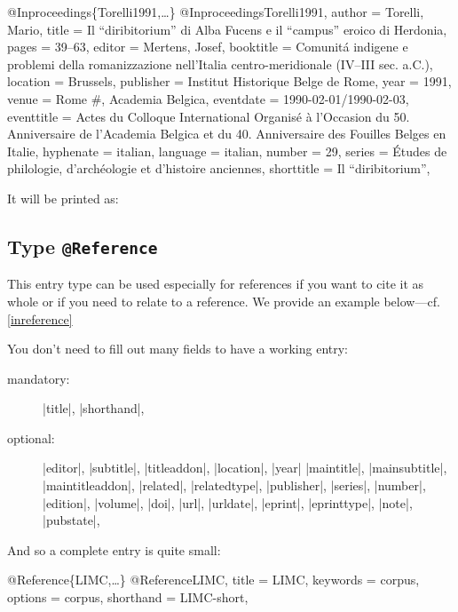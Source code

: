 \documentclass[a4paper,
10pt,
greek,
french,
spanish,
italian,
ngerman,
english,
]{ltxdoc}
\begin{document}
 
 
 \begin{bibexample}[label=Torelli1991]{{@}Inproceedings\{Torelli1991,…\}}
@Inproceedings{Torelli1991,
  author     = {Torelli, Mario},
  title      = {Il \enquote{diribitorium} di Alba Fucens e il \enquote{campus} eroico di Herdonia},
  pages      = {39--63},
  editor     = {Mertens, Josef},
  booktitle  = {Comunitá indigene e problemi della romanizzazione nell’Italia centro\--meri\-dionale (IV--III sec. a.C.)},
  location   = Brussels,     %
  publisher  = {Institut Historique Belge de Rome},
  year       = {1991},
  venue      = Rome #{, Academia Belgica},    %
  eventdate  = {1990-02-01/1990-02-03},
  eventtitle = {Actes du Colloque International Organisé à l'Occasion du 50. Anniversaire de l'Academia Belgica et du 40. Anniversaire des Fouilles Belges en Italie},
  hyphenate  = {italian},
  language   = {italian},
  number     = {29},
  series     = {Études de philologie, d'archéologie et d'histoire anciennes},
  shorttitle = {Il \enquote{diribitorium}},
}
\end{bibexample}
It will be printed as:
 

 \subsection{Type \texttt{@Reference}}\label{reference}
 This entry type can be used especially for references if you want to cite it as whole or if you need to relate to a reference. 
We provide an example below---cf. \cref{inreference}

You don’t need to fill out many fields to have a working entry:
\begin{description}
\item[mandatory:] |title|, |shorthand|,
\item[optional:] 
 |editor|, |subtitle|, |titleaddon|,
 |location|, |year|
|maintitle|, |mainsubtitle|, |maintitleaddon|,
|related|, |relatedtype|,
|publisher|, |series|, |number|, |edition|, |volume|,
|doi|, |url|, |urldate|, |eprint|, |eprinttype|, |note|, |pubstate|, 
\end{description}

And so a complete entry is quite small:
\begin{bibexample}[label=LIMC]{{@}Reference\{LIMC,…\}}
@Reference{LIMC,
  title     = LIMC,
  keywords  = {corpus},
  options   = {corpus},
  shorthand = LIMC-short,
}
\end{bibexample}
 
\end{document}
